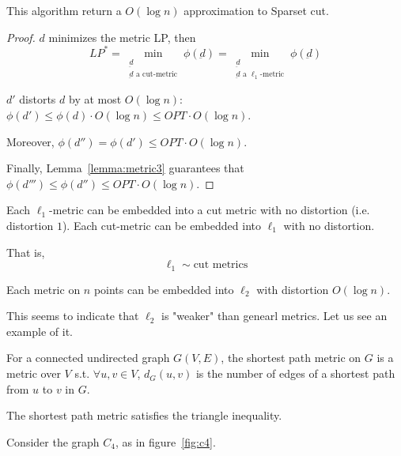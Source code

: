     \begin{theorem}
        This algorithm return a $O(\log n)$ approximation to Sparset cut.
    \end{theorem}

    \begin{proof}
        $d$ minimizes the metric LP, then 
        \[ LP^* = \min_{\substack{\underbar{d}\\ \underbar{d} \text{ a cut-metric}}} \phi(\underbar{d}) = \min_{\substack{\underbar{d}\\ \underbar{d} \text{ a } \ell_1 \text{-metric}}} \phi(\underbar{d}) \]

        $d'$ distorts $d$ by at most $O(\log n)$: $\phi(d') \leq \phi(d) \cdot O(\log n) \leq OPT \cdot O(\log n)$.

        Moreover, $\phi(d'') = \phi(d') \leq OPT \cdot O(\log n)$.

        Finally, Lemma~\ref{lemma:metric3} guarantees that $\phi(d''') \leq \phi(d'') \leq OPT \cdot O(\log n)$.
    \end{proof}

    \begin{lemma}
        Each $\ell_1$-metric can be embedded into a cut metric with no distortion (i.e. distortion $1$).
        Each cut-metric can be embedded into $\ell_1$ with no distortion.
    \end{lemma}

    That is,
    \[ \ell_1 \sim \text{cut metrics} \]

    \begin{theorem}[Bourgain]
        Each metric on $n$ points can be embedded into $\ell_2$ with distortion $O(\log n)$.
    \end{theorem}

    This seems to indicate that $\ell_2$ is "weaker" than genearl metrics.
    Let us see an example of it.

    \begin{definition}
        For a connected undirected graph $G(V,E)$, the shortest path metric on $G$ is a metric over $V$ s.t.
        $\forall u,v \in V$, $d_G(u,v)$ is the number of edges of a shortest path from $u$ to $v$ in $G$.
    \end{definition}

    \begin{observation}
        The shortest path metric satisfies the triangle inequality.
    \end{observation}

    Consider the graph $C_4$, as in figure~\ref{fig:c4}.

